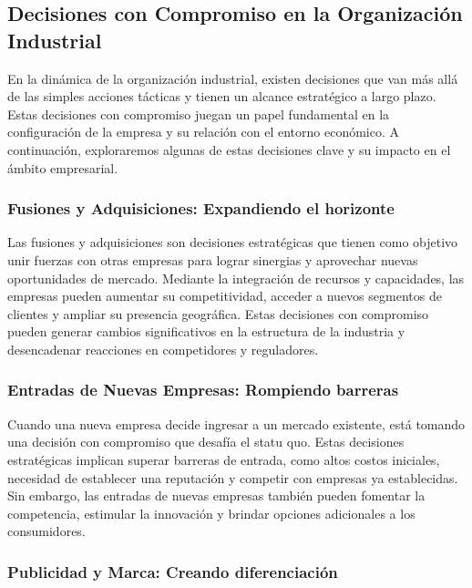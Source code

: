 \documentclass[
  doc,
  floatsintext,
  longtable,
  a4paper,
  nolmodern,
  notxfonts,
  notimes,
  12pt,
  colorlinks=true,linkcolor=blue,citecolor=blue,urlcolor=blue]{apa7}
\begin{document}
\subsection{Decisiones con Compromiso en la Organización
Industrial}\label{decisiones-con-compromiso-en-la-organizaciuxf3n-industrial}

En la dinámica de la organización industrial, existen decisiones que van
más allá de las simples acciones tácticas y tienen un alcance
estratégico a largo plazo. Estas decisiones con compromiso juegan un
papel fundamental en la configuración de la empresa y su relación con el
entorno económico. A continuación, exploraremos algunas de estas
decisiones clave y su impacto en el ámbito empresarial.

\subsubsection{Fusiones y Adquisiciones: Expandiendo el
horizonte}\label{fusiones-y-adquisiciones-expandiendo-el-horizonte}

Las fusiones y adquisiciones son decisiones estratégicas que tienen como
objetivo unir fuerzas con otras empresas para lograr sinergias y
aprovechar nuevas oportunidades de mercado. Mediante la integración de
recursos y capacidades, las empresas pueden aumentar su competitividad,
acceder a nuevos segmentos de clientes y ampliar su presencia
geográfica. Estas decisiones con compromiso pueden generar cambios
significativos en la estructura de la industria y desencadenar
reacciones en competidores y reguladores.

\subsubsection{Entradas de Nuevas Empresas: Rompiendo
barreras}\label{entradas-de-nuevas-empresas-rompiendo-barreras}

Cuando una nueva empresa decide ingresar a un mercado existente, está
tomando una decisión con compromiso que desafía el statu quo. Estas
decisiones estratégicas implican superar barreras de entrada, como altos
costos iniciales, necesidad de establecer una reputación y competir con
empresas ya establecidas. Sin embargo, las entradas de nuevas empresas
también pueden fomentar la competencia, estimular la innovación y
brindar opciones adicionales a los consumidores.

\subsubsection{Publicidad y Marca: Creando
diferenciación}\label{publicidad-y-marca-creando-diferenciaciuxf3n}
\end{document}
